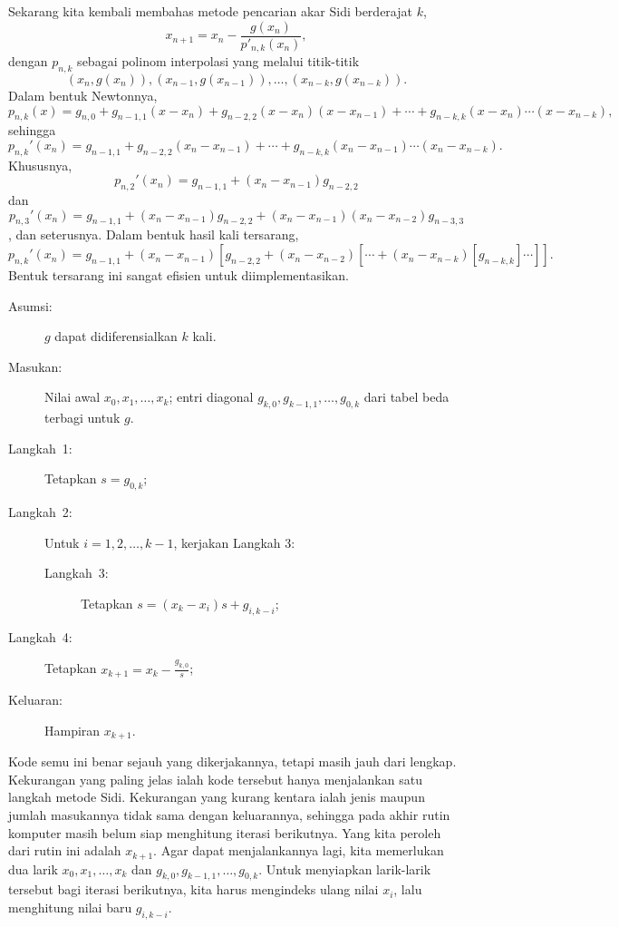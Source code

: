 Sekarang kita kembali membahas metode pencarian akar Sidi berderajat
$k$, 
\[
x_{n+1}=x_{n}-\frac{g(x_{n})}{p'_{n,k}(x_{n})},
\]
dengan $p_{n,k}$ sebagai polinom interpolasi yang melalui titik-titik
\[
(x_{n},g(x_{n})),(x_{n-1},g(x_{n-1})),\ldots,(x_{n-k},g(x_{n-k})).
\]
Dalam bentuk Newtonnya,
\[
p_{n,k}(x)=g_{n,0}+g_{n-1,1}(x-x_{n})+g_{n-2,2}(x-x_{n})(x-x_{n-1})+\cdots+g_{n-k,k}(x-x_{n})\cdots(x-x_{n-k}),
\]
sehingga
\begin{equation}
p_{n,k}'(x_{n})=g_{n-1,1}+g_{n-2,2}(x_{n}-x_{n-1})+\cdots+g_{n-k,k}(x_{n}-x_{n-1})\cdots(x_{n}-x_{n-k}).\label{eq:sidisDerivative}
\end{equation}
Khususnya,
\[
p_{n,2}'(x_{n})=g_{n-1,1}+(x_{n}-x_{n-1})g_{n-2,2}
\]
dan
\[
p_{n,3}'(x_{n})=g_{n-1,1}+(x_{n}-x_{n-1})g_{n-2,2}+(x_{n}-x_{n-1})(x_{n}-x_{n-2})g_{n-3,3}
\]
, dan seterusnya. Dalam bentuk hasil kali tersarang,
\[
p_{n,k}'(x_{n})=g_{n-1,1}+(x_{n}-x_{n-1})\left[g_{n-2,2}+(x_{n}-x_{n-2})\left[\cdots+(x_{n}-x_{n-k})\left[g_{n-k,k}\right]\cdots\right]\right].
\]
Bentuk tersarang ini sangat efisien untuk diimplementasikan.

\noindent\begin{pseudocode} 
\begin{description}
\item [{Asumsi:}] $g$ dapat didiferensialkan $k$ kali.
\item [{Masukan:}] Nilai awal $x_{0},x_{1},\ldots,x_{k}$; entri diagonal
$g_{k,0},g_{k-1,1},\ldots,g_{0,k}$ dari tabel beda terbagi untuk
$g$.
\item [{Langkah~1:}] Tetapkan $s=g_{0,k}$;
\item [{Langkah~2:}] Untuk $i=1,2,\ldots,k-1$, kerjakan Langkah 3:

\begin{description}
\item [{Langkah~3:}] Tetapkan $s=(x_{k}-x_{i})s+g_{i,k-i}$;
\end{description}
\item [{Langkah~4:}] Tetapkan ${\displaystyle x_{k+1}=x_{k}-\frac{g_{k,0}}{s}}$;
\item [{Keluaran:}] Hampiran $x_{k+1}$.
\end{description}
\end{pseudocode} 

\noindent Kode semu ini benar sejauh yang dikerjakannya, tetapi masih
jauh dari lengkap. Kekurangan yang paling jelas ialah kode tersebut
hanya menjalankan satu langkah metode Sidi. Kekurangan yang kurang
kentara ialah jenis maupun jumlah masukannya tidak sama dengan keluarannya,
sehingga pada akhir rutin komputer masih belum siap menghitung iterasi
berikutnya. Yang kita peroleh dari rutin ini adalah $x_{k+1}$. Agar
dapat menjalankannya lagi, kita memerlukan dua larik $x_{0},x_{1},\ldots,x_{k}$
dan $g_{k,0},g_{k-1,1},\ldots,g_{0,k}$. Untuk menyiapkan larik-larik
tersebut bagi iterasi berikutnya, kita harus mengindeks ulang nilai
$x_{i}$, lalu menghitung nilai baru $g_{i,k-i}$.

